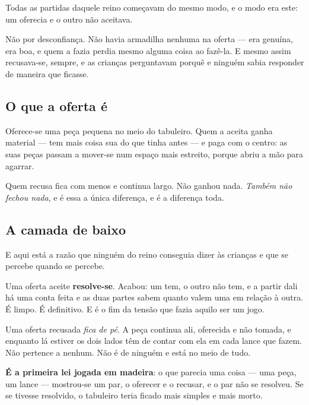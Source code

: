 \documentclass[livro.tex]{subfiles}
\begin{document}
Todas as partidas daquele reino começavam do mesmo modo, e o modo era este: um oferecia e o outro
não aceitava.

\medskip

Não por desconfiança. Não havia armadilha nenhuma na oferta --- era genuína, era boa, e quem a
fazia perdia mesmo alguma coisa ao fazê-la. E mesmo assim recusava-se, sempre, e as crianças
perguntavam porquê e ninguém sabia responder de maneira que ficasse.

\subsection*{O que a oferta é}

Oferece-se uma peça pequena no meio do tabuleiro. Quem a aceita ganha material --- tem mais coisa
sua do que tinha antes --- e paga com o centro: as suas peças passam a mover-se num espaço mais
estreito, porque abriu a mão para agarrar.

\medskip

Quem recusa fica com menos e continua largo. Não ganhou nada. \emph{Também não fechou nada}, e é
essa a única diferença, e é a diferença toda.

\subsection*{A camada de baixo}

E aqui está a razão que ninguém do reino conseguia dizer às crianças e que se percebe quando se
percebe.

\medskip

Uma oferta aceite \textbf{resolve-se}. Acabou: um tem, o outro não tem, e a partir dali há uma
conta feita e as duas partes sabem quanto valem uma em relação à outra. É limpo. É definitivo. E é
o fim da tensão que fazia aquilo ser um jogo.

\medskip

Uma oferta recusada \emph{fica de pé}. A peça continua ali, oferecida e não tomada, e enquanto lá
estiver os dois lados têm de contar com ela em cada lance que fazem. Não pertence a nenhum. Não é
de ninguém e está no meio de tudo.

\medskip

\textbf{É a primeira lei jogada em madeira}: o que parecia uma coisa --- uma peça, um lance ---
mostrou-se um par, o oferecer e o recusar, e o par não se resolveu. Se se tivesse resolvido, o
tabuleiro teria ficado mais simples e mais morto.
\end{document}

